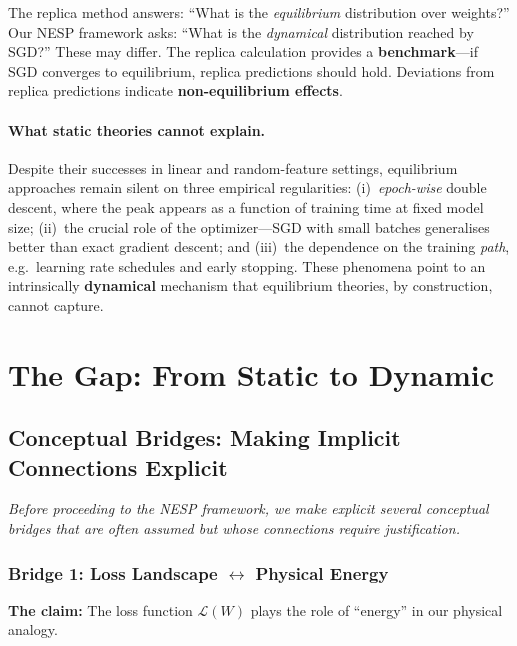 \documentclass[
  journal=largetwo,
  simfonts=false,
  year=2025,
  volume=37,
]{cup-journal}
\begin{document}
\begin{remark}
The replica method answers: ``What is the \textit{equilibrium} distribution over weights?'' Our NESP framework asks: ``What is the \textit{dynamical} distribution reached by SGD?'' These may differ. The replica calculation provides a \textbf{benchmark}---if SGD converges to equilibrium, replica predictions should hold. Deviations from replica predictions indicate \textbf{non-equilibrium effects}.
\end{remark}

\paragraph{What static theories cannot explain.}
Despite their successes in linear and random-feature settings, equilibrium approaches remain silent on three empirical regularities: (i)~\textit{epoch-wise} double descent, where the peak appears as a function of training time at fixed model size; (ii)~the crucial role of the optimizer---SGD with small batches generalises better than exact gradient descent; and (iii)~the dependence on the training \textit{path}, e.g.\ learning rate schedules and early stopping. These phenomena point to an intrinsically \textbf{dynamical} mechanism that equilibrium theories, by construction, cannot capture.

\section{The Gap: From Static to Dynamic}

\subsection{Conceptual Bridges: Making Implicit Connections Explicit}\label{sec:conceptual_bridges}

\textit{Before proceeding to the NESP framework, we make explicit several conceptual bridges that are often assumed but whose connections require justification.}

\subsubsection{Bridge 1: Loss Landscape \texorpdfstring{$\leftrightarrow$}{<->} Physical Energy}

\textbf{The claim:} The loss function $\mathcal{L}(W)$ plays the role of ``energy'' in our physical analogy.
\end{document}
